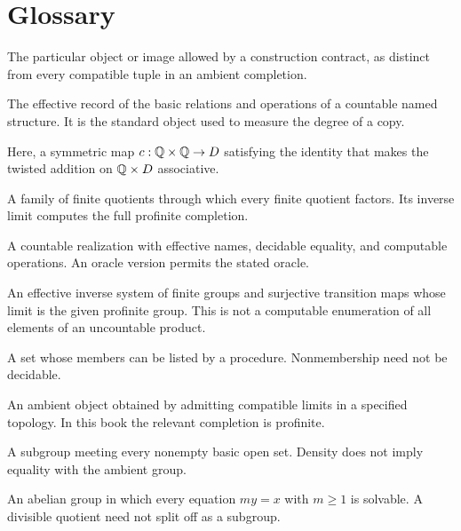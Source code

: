 \chapter{Glossary}
\label{app:glossary}
\begin{description}[style=nextline,leftmargin=0pt,labelindent=0pt,labelwidth=0pt,labelsep=0pt,itemindent=0pt,font=\bfseries\color{Ink},itemsep=9pt]
\item[Admissible realization] The particular object or image allowed by a construction contract, as distinct from every compatible tuple in an ambient completion.
\item[Atomic diagram] The effective record of the basic relations and operations of a countable named structure. It is the standard object used to measure the degree of a copy.
\item[Cocycle] Here, a symmetric map $c:\mathbb Q\times\mathbb Q\to D$ satisfying the identity that makes the twisted addition on $\mathbb Q\times D$ associative.
\item[Cofinal quotient system] A family of finite quotients through which every finite quotient factors. Its inverse limit computes the full profinite completion.
\item[Computable copy] A countable realization with effective names, decidable equality, and computable operations. An oracle version permits the stated oracle.
\item[Computable profinite presentation] An effective inverse system of finite groups and surjective transition maps whose limit is the given profinite group. This is not a computable enumeration of all elements of an uncountable product.
\item[Computably enumerable set] A set whose members can be listed by a procedure. Nonmembership need not be decidable.
\item[Completion] An ambient object obtained by admitting compatible limits in a specified topology. In this book the relevant completion is profinite.
\item[Dense subgroup] A subgroup meeting every nonempty basic open set. Density does not imply equality with the ambient group.
\item[Divisible abelian group] An abelian group in which every equation $my=x$ with $m\ge1$ is solvable. A divisible quotient need not split off as a subgroup.

\end{description}
